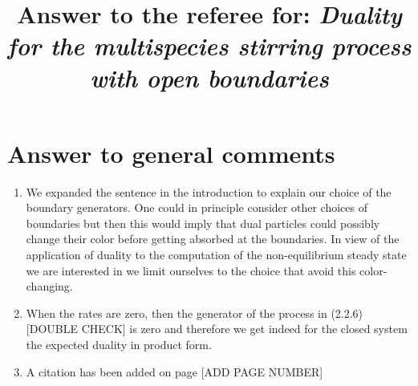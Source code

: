 \documentclass[10pt]{article}
\title{Answer to the referee for: \textit{Duality for the multispecies stirring process with open boundaries}}
\numberwithin{equation}{section}
\numberwithin{equation}{subsection}
\newcommand{\fra}[1]{\textcolor[rgb]{0,0,1}{#1}}
\begin{document}
		\maketitle
		\section*{Answer to general comments}
		\begin{enumerate}
			\item%
				We expanded the sentence in the introduction to explain our choice of the boundary generators. One could in principle consider other choices of boundaries but then this would imply that dual particles could possibly change their color before getting absorbed at the boundaries. In view of the application of duality to the computation of the non-equilibrium steady state we are interested in we limit ourselves to the choice that avoid this color-changing.
				\item%
					When the rates are zero, then the generator of the process in (2.2.6) [DOUBLE CHECK] is zero and therefore we get indeed for the closed system the expected duality in product form.
					\item %
						A citation has been added on page [ADD PAGE NUMBER]

\end{enumerate}
\end{document}
